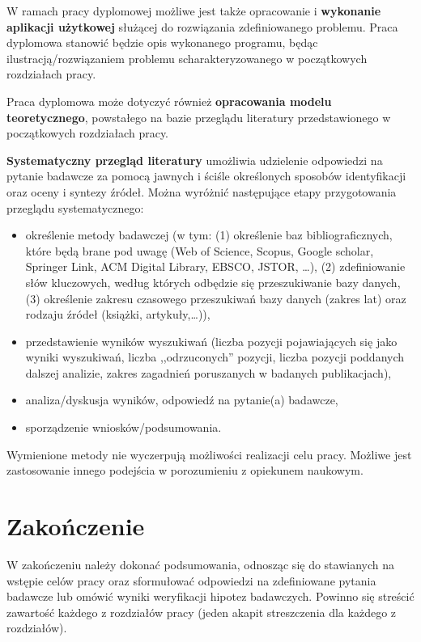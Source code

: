 W ramach pracy dyplomowej możliwe jest także opracowanie i \textbf{wykonanie aplikacji użytkowej} służącej do rozwiązania zdefiniowanego problemu. Praca dyplomowa stanowić będzie opis wykonanego programu, będąc ilustracją/rozwiązaniem problemu scharakteryzowanego w początkowych rozdziałach pracy.

Praca dyplomowa może dotyczyć również \textbf{opracowania modelu teoretycznego}, powstałego na bazie przeglądu literatury przedstawionego w początkowych rozdziałach pracy.

\textbf{Systematyczny przegląd literatury} \citep{mazur2018jak} umożliwia udzielenie odpowiedzi na pytanie badawcze za pomocą jawnych i ściśle określonych sposobów identyfikacji oraz oceny i syntezy źródeł. Można wyróżnić następujące etapy przygotowania przeglądu systematycznego:

\begin{itemize}
	\item określenie metody badawczej (w tym: (1) określenie baz bibliograficznych, które będą brane pod uwagę (Web of Science, Scopus, Google scholar, Springer Link, ACM Digital Library, EBSCO, JSTOR, …), (2) zdefiniowanie słów kluczowych, według których odbędzie się przeszukiwanie bazy danych, (3) określenie zakresu czasowego przeszukiwań bazy danych (zakres lat) oraz rodzaju źródeł (książki, artykuły,…)),
	\item przedstawienie wyników wyszukiwań (liczba pozycji pojawiających się jako wyniki wyszukiwań, liczba ,,odrzuconych'' pozycji, liczba pozycji poddanych dalszej analizie, zakres zagadnień poruszanych w badanych publikacjach),
	\item analiza/dyskusja wyników, odpowiedź na pytanie(a) badawcze, 
	\item sporządzenie wniosków/podsumowania.
\end{itemize}

Wymienione metody nie wyczerpują możliwości realizacji celu pracy. 
Możliwe jest zastosowanie innego podejścia w porozumieniu z opiekunem naukowym.


\section{Zakończenie}

W zakończeniu należy dokonać podsumowania, odnosząc się do stawianych na wstępie celów pracy oraz sformułować odpowiedzi na zdefiniowane pytania badawcze lub omówić wyniki weryfikacji hipotez badawczych. Powinno się  streścić zawartość każdego z rozdziałów pracy (jeden akapit streszczenia dla każdego z rozdziałów).


